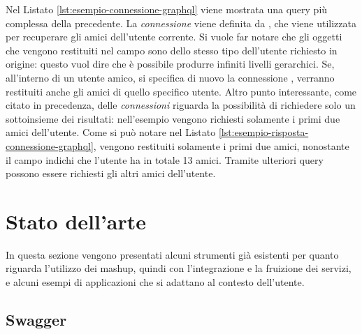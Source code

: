 Nel Listato \ref{lst:esempio-connessione-graphql} viene mostrata una query più complessa della precedente. La \emph{connessione} viene definita da , che viene utilizzata per recuperare gli amici dell'utente corrente. Si vuole far notare che gli oggetti che vengono restituiti nel campo  sono dello stesso tipo dell'utente richiesto in origine: questo vuol dire che è possibile produrre infiniti livelli gerarchici. Se, all'interno di un utente amico, si specifica di nuovo la connessione , verranno restituiti anche gli amici di quello specifico utente. Altro punto interessante, come citato in precedenza, delle \emph{connessioni} riguarda la possibilità di richiedere solo un sottoinsieme dei risultati: nell'esempio vengono richiesti solamente i primi due amici dell'utente. Come si può notare nel Listato \ref{lst:esempio-risposta-connessione-graphql}, vengono restituiti solamente i primi due amici, nonostante il campo  indichi che l'utente ha in totale 13 amici. Tramite ulteriori query possono essere richiesti gli altri amici dell'utente.

\section{Stato dell'arte\label{sec:stato-arte}}

In questa sezione vengono presentati alcuni strumenti già esistenti per quanto riguarda l'utilizzo dei mashup, quindi con l'integrazione e la fruizione dei servizi, e alcuni esempi di applicazioni che si adattano al contesto dell'utente.

\subsection*{Swagger}

